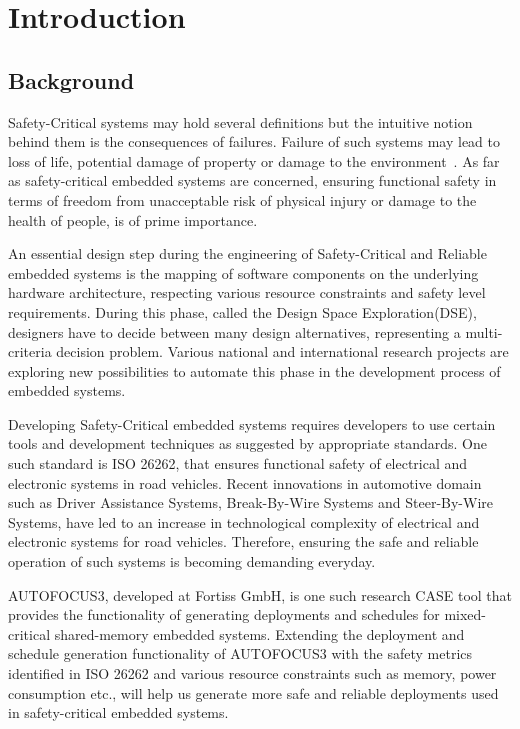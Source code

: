 \chapter{Introduction}\label{chapter:introduction}

\section{Background}

Safety-Critical systems may hold several definitions but the intuitive notion behind them is the consequences of failures. Failure of such systems may lead to loss of life, potential damage of property or damage to the environment~\cite{Knight:2002:SCS:581339.581406}. As far as safety-critical embedded systems are concerned, ensuring functional safety in terms of freedom from unacceptable risk of physical injury or damage to the health of people, is of prime importance. 

An essential design step during the engineering of Safety-Critical and Reliable embedded systems is the mapping of software components on the underlying hardware architecture, respecting various resource constraints and safety level requirements. During this phase, called the Design Space Exploration(DSE), designers have to decide between many design alternatives, representing a multi-criteria decision problem. Various national and international research projects are exploring new possibilities to automate this phase in the development process of embedded systems.

Developing Safety-Critical embedded systems requires developers to use certain tools and development techniques as suggested by appropriate standards. One such standard is ISO 26262, that ensures functional safety of electrical and electronic systems in road vehicles. Recent innovations in automotive domain such as Driver Assistance Systems, Break-By-Wire Systems and Steer-By-Wire Systems, have led to an increase in technological complexity of electrical and electronic systems for road vehicles. Therefore, ensuring the safe and reliable operation of such systems is becoming demanding everyday. 

AUTOFOCUS3, developed at Fortiss GmbH, is one such research CASE tool that provides the functionality of generating deployments and schedules for mixed-critical shared-memory embedded systems. Extending the deployment and schedule generation functionality of AUTOFOCUS3 with the safety metrics identified in ISO 26262 and various resource constraints such as memory, power consumption etc., will help us generate more safe and reliable deployments used in safety-critical embedded systems.

